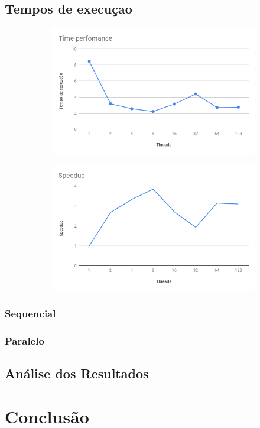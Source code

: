 \documentclass{article}
\begin{document}
\subsection{Tempos de execuçao}
\begin{figure}[!htb]
  \centering
  \begin{subfigure}{.5\textwidth}
    \centering
    \includegraphics[width=.9\linewidth]{TimePerfomance.png}

  \end{subfigure}%
  \begin{subfigure}{.5\textwidth}
    \centering
    \includegraphics[width=.9\linewidth]{Speedup.png}
  \end{subfigure}
\end{figure}

\subsubsection{Sequencial}

\subsubsection{Paralelo}

\subsection{Análise dos Resultados}

\section{Conclusão}

\clearpage
\end{document}

